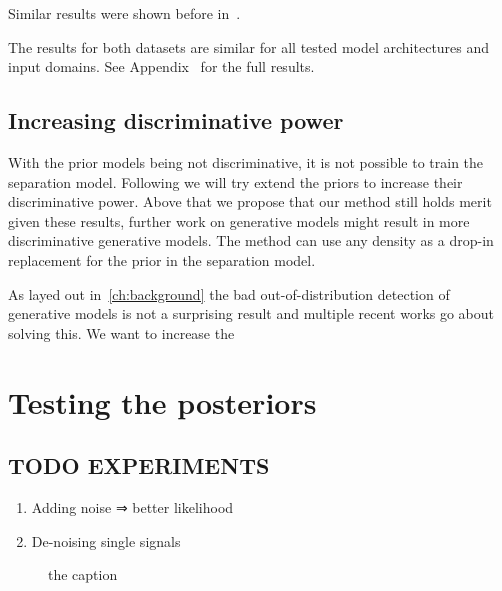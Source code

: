 Similar results were shown before in~.

The results for both datasets are similar for all tested model architectures and input domains. See Appendix~ for the full results.

\subsection{Increasing discriminative power}
With the prior models being not discriminative, it is not possible to train the separation model. Following we will try extend the priors to increase their discriminative power. Above that we propose that our method still holds merit given these results, further work on generative models might result in more discriminative generative models. The method can use any density as a drop-in replacement for the prior in the separation model.

As layed out in~\ref{ch:background} the bad out-of-distribution detection of generative models is not a surprising result and multiple recent works go about solving this. We want to increase the


\section{Testing the posteriors}

\subsection{TODO EXPERIMENTS}
\begin{enumerate}
    \item Adding noise ⇒ better likelihood
    \item De-noising single signals
\end{enumerate}

\begin{figure}[]
    
    \caption{the caption}%
    \label{fig:channels}%
\end{figure}
